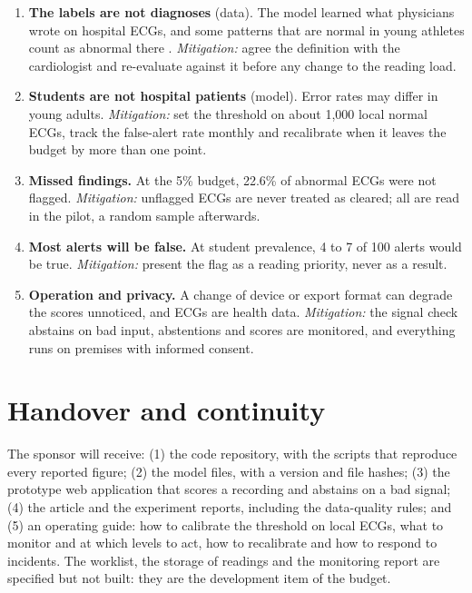 \documentclass[letterpaper,11pt]{article}
\begin{document}
\begin{enumerate}\setlength{\itemsep}{0pt}\setlength{\parskip}{0pt}
  \item \textbf{The labels are not diagnoses} (data). The model learned what physicians wrote on hospital ECGs, and some patterns that are normal in young athletes count as abnormal there \parencite{drezner2017international}. \emph{Mitigation:} agree the definition with the cardiologist and re-evaluate against it before any change to the reading load.
  \item \textbf{Students are not hospital patients} (model). Error rates may differ in young adults. \emph{Mitigation:} set the threshold on about 1,000 local normal ECGs, track the false-alert rate monthly and recalibrate when it leaves the budget by more than one point.
  \item \textbf{Missed findings.} At the 5\% budget, 22.6\% of abnormal ECGs were not flagged. \emph{Mitigation:} unflagged ECGs are never treated as cleared; all are read in the pilot, a random sample afterwards.
  \item \textbf{Most alerts will be false.} At student prevalence, 4 to 7 of 100 alerts would be true. \emph{Mitigation:} present the flag as a reading priority, never as a result.
  \item \textbf{Operation and privacy.} A change of device or export format can degrade the scores unnoticed, and ECGs are health data. \emph{Mitigation:} the signal check abstains on bad input, abstentions and scores are monitored, and everything runs on premises with informed consent.
\end{enumerate}

\section*{Handover and continuity}

The sponsor will receive: (1) the code repository, with the scripts that reproduce every reported figure; (2) the model files, with a version and file hashes; (3) the prototype web application that scores a recording and abstains on a bad signal; (4) the article and the experiment reports, including the data-quality rules; and (5) an operating guide: how to calibrate the threshold on local ECGs, what to monitor and at which levels to act, how to recalibrate and how to respond to incidents. The worklist, the storage of readings and the monitoring report are specified but not built: they are the development item of the budget.
\end{document}
